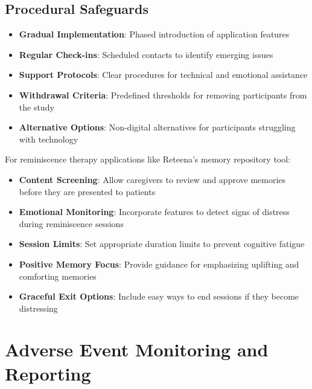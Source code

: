 \subsection{Procedural Safeguards}
\begin{itemize}
    \item \textbf{Gradual Implementation}: Phased introduction of application features
    
    \item \textbf{Regular Check-ins}: Scheduled contacts to identify emerging issues
    
    \item \textbf{Support Protocols}: Clear procedures for technical and emotional assistance
    
    \item \textbf{Withdrawal Criteria}: Predefined thresholds for removing participants from the study
    
    \item \textbf{Alternative Options}: Non-digital alternatives for participants struggling with technology
\end{itemize}

\begin{tcolorbox}[infobox, title=Risk Mitigation for Reminiscence Therapy Applications]
For reminiscence therapy applications like Reteena's memory repository tool:
\begin{itemize}
    \item \textbf{Content Screening}: Allow caregivers to review and approve memories before they are presented to patients
    
    \item \textbf{Emotional Monitoring}: Incorporate features to detect signs of distress during reminiscence sessions
    
    \item \textbf{Session Limits}: Set appropriate duration limits to prevent cognitive fatigue
    
    \item \textbf{Positive Memory Focus}: Provide guidance for emphasizing uplifting and comforting memories
    
    \item \textbf{Graceful Exit Options}: Include easy ways to end sessions if they become distressing
\end{itemize}
\end{tcolorbox}

\section{Adverse Event Monitoring and Reporting}
